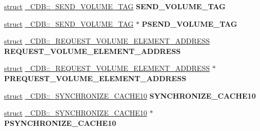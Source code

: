 \begin{DoxyCompactItemize}
\item 
\mbox{\label{union___c_d_b_a09a787ded798290f17bfaf95b2156ede}} 
\hyperlink{interfacestruct}{struct} \hyperlink{struct___c_d_b_1_1___s_e_n_d___v_o_l_u_m_e___t_a_g}{\+\_\+\+C\+D\+B\+::\+\_\+\+S\+E\+N\+D\+\_\+\+V\+O\+L\+U\+M\+E\+\_\+\+T\+AG} {\bfseries S\+E\+N\+D\+\_\+\+V\+O\+L\+U\+M\+E\+\_\+\+T\+AG}
\item 
\mbox{\label{union___c_d_b_ac03cc8bd387de91ebeaf6257352475fd}} 
\hyperlink{interfacestruct}{struct} \hyperlink{struct___c_d_b_1_1___s_e_n_d___v_o_l_u_m_e___t_a_g}{\+\_\+\+C\+D\+B\+::\+\_\+\+S\+E\+N\+D\+\_\+\+V\+O\+L\+U\+M\+E\+\_\+\+T\+AG} $\ast$ {\bfseries P\+S\+E\+N\+D\+\_\+\+V\+O\+L\+U\+M\+E\+\_\+\+T\+AG}
\item 
\mbox{\label{union___c_d_b_a1077b3eae295c33093a80c98be778115}} 
\hyperlink{interfacestruct}{struct} \hyperlink{struct___c_d_b_1_1___r_e_q_u_e_s_t___v_o_l_u_m_e___e_l_e_m_e_n_t___a_d_d_r_e_s_s}{\+\_\+\+C\+D\+B\+::\+\_\+\+R\+E\+Q\+U\+E\+S\+T\+\_\+\+V\+O\+L\+U\+M\+E\+\_\+\+E\+L\+E\+M\+E\+N\+T\+\_\+\+A\+D\+D\+R\+E\+SS} {\bfseries R\+E\+Q\+U\+E\+S\+T\+\_\+\+V\+O\+L\+U\+M\+E\+\_\+\+E\+L\+E\+M\+E\+N\+T\+\_\+\+A\+D\+D\+R\+E\+SS}
\item 
\mbox{\label{union___c_d_b_ade7f287da1a6ede142611d1938fbff09}} 
\hyperlink{interfacestruct}{struct} \hyperlink{struct___c_d_b_1_1___r_e_q_u_e_s_t___v_o_l_u_m_e___e_l_e_m_e_n_t___a_d_d_r_e_s_s}{\+\_\+\+C\+D\+B\+::\+\_\+\+R\+E\+Q\+U\+E\+S\+T\+\_\+\+V\+O\+L\+U\+M\+E\+\_\+\+E\+L\+E\+M\+E\+N\+T\+\_\+\+A\+D\+D\+R\+E\+SS} $\ast$ {\bfseries P\+R\+E\+Q\+U\+E\+S\+T\+\_\+\+V\+O\+L\+U\+M\+E\+\_\+\+E\+L\+E\+M\+E\+N\+T\+\_\+\+A\+D\+D\+R\+E\+SS}
\item 
\mbox{\label{union___c_d_b_a0f21e219b35ad15589d0608e2267b81e}} 
\hyperlink{interfacestruct}{struct} \hyperlink{struct___c_d_b_1_1___s_y_n_c_h_r_o_n_i_z_e___c_a_c_h_e10}{\+\_\+\+C\+D\+B\+::\+\_\+\+S\+Y\+N\+C\+H\+R\+O\+N\+I\+Z\+E\+\_\+\+C\+A\+C\+H\+E10} {\bfseries S\+Y\+N\+C\+H\+R\+O\+N\+I\+Z\+E\+\_\+\+C\+A\+C\+H\+E10}
\item 
\mbox{\label{union___c_d_b_a0e02dd7e392bc95f7d47faf4fd8aeac3}} 
\hyperlink{interfacestruct}{struct} \hyperlink{struct___c_d_b_1_1___s_y_n_c_h_r_o_n_i_z_e___c_a_c_h_e10}{\+\_\+\+C\+D\+B\+::\+\_\+\+S\+Y\+N\+C\+H\+R\+O\+N\+I\+Z\+E\+\_\+\+C\+A\+C\+H\+E10} $\ast$ {\bfseries P\+S\+Y\+N\+C\+H\+R\+O\+N\+I\+Z\+E\+\_\+\+C\+A\+C\+H\+E10}

\end{DoxyCompactItemize}
